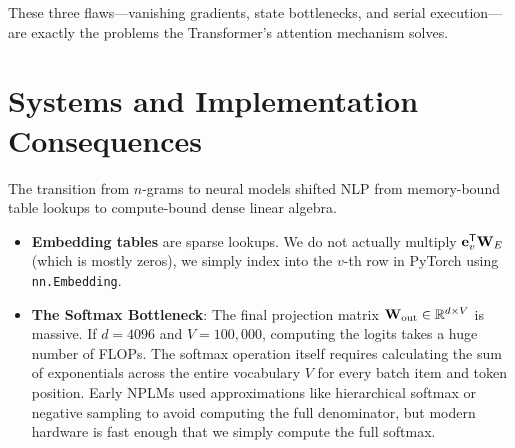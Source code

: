 These three flaws---vanishing gradients, state bottlenecks, and serial execution---are exactly the problems the Transformer's attention mechanism solves.

\section{Systems and Implementation Consequences}
\label{ch:08:sec:systems}

The transition from $n$-grams to neural models shifted NLP from memory-bound table lookups to compute-bound dense linear algebra.

\begin{itemize}
    \item \textbf{Embedding tables} are sparse lookups. We do not actually multiply $\mathbf{e}_v^{\mathsf{T}} \mathbf{W}_E$ (which is mostly zeros), we simply index into the $v$-th row in PyTorch using \texttt{nn.Embedding}.
    \item \textbf{The Softmax Bottleneck}: The final projection matrix $\mathbf{W}_{\text{out}} \in \mathbb{R}^{d \times V}$ is massive. If $d=4096$ and $V=100,000$, computing the logits takes a huge number of FLOPs. The softmax operation itself requires calculating the sum of exponentials across the entire vocabulary $V$ for every batch item and token position. Early NPLMs used approximations like hierarchical softmax or negative sampling to avoid computing the full denominator, but modern hardware is fast enough that we simply compute the full softmax.
\end{itemize}

